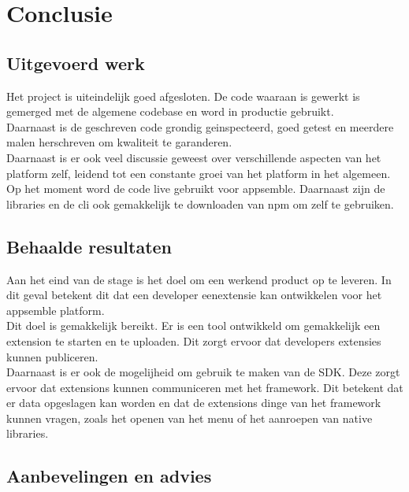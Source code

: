 \chapter{Conclusie}

\section{Uitgevoerd werk}
Het project is uiteindelijk goed afgesloten. De code waaraan is gewerkt  is gemerged met de algemene codebase en word in productie gebruikt. \\

Daarnaast is de geschreven code grondig geinspecteerd, goed getest en meerdere malen herschreven om kwaliteit te garanderen. \\

Daarnaast is er ook veel discussie geweest over verschillende aspecten van het platform zelf, leidend tot een constante groei van het platform in het algemeen. \\

Op het moment word de code live gebruikt voor appsemble. Daarnaast zijn de libraries en de cli ook gemakkelijk te downloaden van npm om zelf te gebruiken. 

\section{Behaalde resultaten}

Aan het eind van de stage is het doel om een werkend product op te leveren. In dit geval betekent dit dat een developer eenextensie kan ontwikkelen voor het appsemble platform. \\

Dit doel is gemakkelijk bereikt. Er is een tool ontwikkeld om gemakkelijk een extension te starten en te uploaden. Dit zorgt ervoor dat developers extensies kunnen publiceren. \\

Daarnaast is er ook de mogelijheid om gebruik te maken van de SDK. Deze zorgt ervoor dat extensions kunnen communiceren met het framework. Dit betekent dat er data opgeslagen kan worden en dat de extensions dinge van het framework kunnen vragen, zoals het openen van het menu of het aanroepen van native libraries.

\section{Aanbevelingen en advies}

